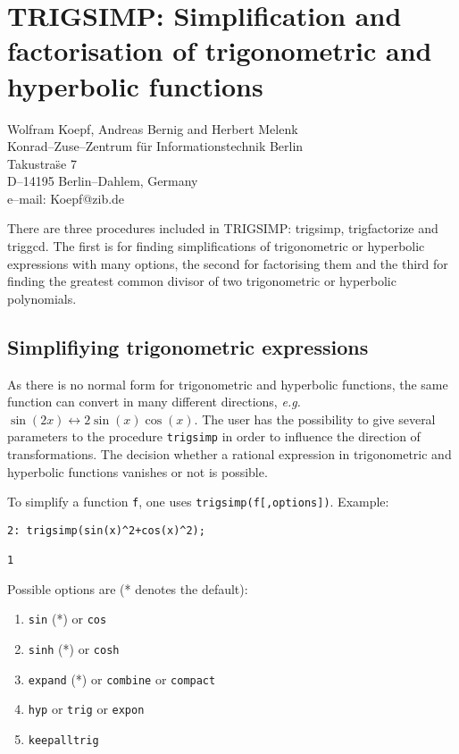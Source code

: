 \chapter[TRIGSIMP: Trigonometric simplification]%
        {TRIGSIMP: Simplification and factorisation of trigonometric
and hyperbolic functions}
\label{TRIGSIMP}

{\footnotesize
\begin{center}
Wolfram Koepf, Andreas Bernig and Herbert Melenk\\
Konrad--Zuse--Zentrum f\"ur Informationstechnik Berlin \\
Takustra\"se 7 \\
D--14195 Berlin--Dahlem, Germany \\[0.05in]
e--mail: Koepf@zib.de
\end{center}
}

There are three
procedures included in TRIGSIMP: trigsimp, trigfactorize and triggcd. 
The first is for finding simplifications of trigonometric or 
hyperbolic expressions with many options, the second for factorising 
them and the third 
for finding the greatest common divisor of two trigonometric or 
hyperbolic polynomials.

\section{Simplifiying trigonometric expressions}

As there is no normal form for trigonometric and hyperbolic functions,
the same function can convert in many different directions, {\em e.g. }
$\sin(2x) \leftrightarrow 2\sin(x)\cos(x)$. 
The user has the possibility to give several parameters to the 
procedure {\tt trigsimp} in order to influence the direction of
transformations.  The decision whether a rational expression in
trigonometric  and hyperbolic functions vanishes or not is possible.

To simplify a function {\tt f}, one uses {\tt trigsimp(f[,options])}. Example:

\begin{verbatim}
2: trigsimp(sin(x)^2+cos(x)^2);

1
\end{verbatim}


Possible options are (* denotes the default):
\begin{enumerate}
\item {\tt sin} (*) or {\tt cos}
\item {\tt sinh} (*) or {\tt cosh}
\item {\tt expand} (*) or {\tt combine} or {\tt compact}
\item {\tt hyp} or {\tt trig} or {\tt expon}
\item {\tt keepalltrig}
\end{enumerate}

